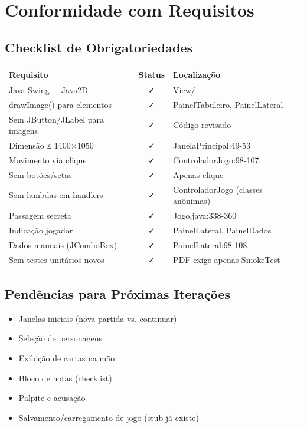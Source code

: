 \documentclass[12pt,a4paper]{report}
\begin{document}
\chapter{Conformidade com Requisitos}

\section{Checklist de Obrigatoriedades}

\begin{table}[h]
\centering
\begin{tabular}{|p{5cm}|c|p{4cm}|}
\hline
\textbf{Requisito} & \textbf{Status} & \textbf{Localização} \\
\hline
Java Swing + Java2D & ✓ & View/ \\
\hline
drawImage() para elementos & ✓ & PainelTabuleiro, PainelLateral \\
\hline
Sem JButton/JLabel para imagens & ✓ & Código revisado \\
\hline
Dimensão ≤ 1400×1050 & ✓ & JanelaPrincipal:49-53 \\
\hline
Movimento via clique & ✓ & ControladorJogo:98-107 \\
\hline
Sem botões/setas & ✓ & Apenas clique \\
\hline
Sem lambdas em handlers & ✓ & ControladorJogo (classes anônimas) \\
\hline
Passagem secreta & ✓ & Jogo.java:338-360 \\
\hline
Indicação jogador & ✓ & PainelLateral, PainelDados \\
\hline
Dados manuais (JComboBox) & ✓ & PainelLateral:98-108 \\
\hline
Sem testes unitários novos & ✓ & PDF exige apenas SmokeTest \\
\hline
\end{tabular}
\end{table}

\section{Pendências para Próximas Iterações}

\begin{itemize}
    \item Janelas iniciais (nova partida vs. continuar)
    \item Seleção de personagens
    \item Exibição de cartas na mão
    \item Bloco de notas (checklist)
    \item Palpite e acusação
    \item Salvamento/carregamento de jogo (stub já existe)
\end{itemize}
\end{document}
